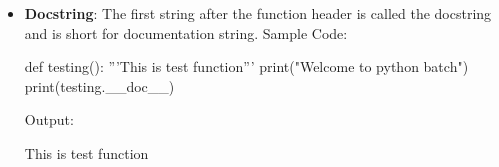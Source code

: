 \begin{flushleft}
\begin{itemize}
		
		\newpage
		\item \textbf{Docstring}: The first string after the function header is called the docstring and is short
for documentation string.
		\newline
		Sample Code:
		\begin{tcolorbox}[breakable,notitle,boxrule=-0pt,colback=black,colframe=black]
			\color{green}
			\font=9pt
			def testing(): \newline
			\hphantom{} \hphantom{} '''This is test function''' \newline
			\hphantom{} \hphantom{} print("Welcome to python batch") \newline
			\newline
			print(testing.\_\_doc\_\_)
			\font=4pt
		\end{tcolorbox}
		
		Output:
		\begin{tcolorbox}[breakable,notitle,boxrule=-0pt,colback=output,colframe=output]
			\color{black}
			This is test function
			\font=4pt
		\end{tcolorbox}
		
		
		
	\end{itemize}
	
\end{flushleft}


